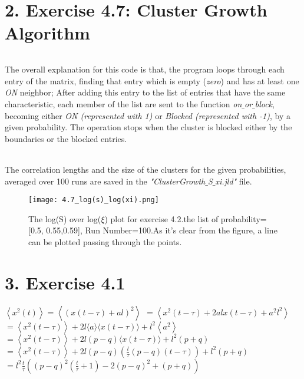 \documentclass[12pt]{article}
\begin{document}
\part*{2. Exercise 4.7: Cluster Growth Algorithm }
\paragraph*{} The overall explanation for this code is that, the program loops through each entry of the matrix, finding that entry which is empty (\textit{zero}) and has at least one \textit{ON} neighbor; After adding this entry to the list of entries that have the same characteristic, each member of the list are sent to the function \textit{on$\_$or$\_$block}, becoming either \textit{ON (represented with 1)} or \textit{Blocked (represented with -1)}, by a given probability. The operation stops when the cluster is blocked either by the boundaries or the blocked entries. 
\paragraph*{} The correlation lengths and the size of the clusters for the given probabilities, averaged over 100 runs are saved in the \textit{"ClusterGrowth$\_$S$\_$xi.jld"} file. 
\begin{figure}[H]
	\centering
	\texttt{[image: 4.7\_log(s)\_log(xi).png]}
	\label{fig:mesh2}
	\caption{The log(S) over log($\xi$) plot for exercise 4.2.the list of probability=[0.5, 0.55,0.59], Run Number=100.As it's clear from the figure, a line can be plotted passing through the points.}
\end{figure}
\part*{3. Exercise 4.1}
$\left\langle x^{2}(t)\right\rangle=\left\langle(x(t-\tau)+a l)^{2}\right\rangle$
$=\left\langle x^{2}(t-\tau)+2 a l x(t-\tau)+a^{2} l^{2}\right\rangle$\\
$=\left\langle x^{2}(t-\tau)\right\rangle+2 l\langle a\rangle\langle x(t-\tau)\rangle+l^{2}\left\langle a^{2}\right\rangle$ $=\left\langle x^{2}(t-\tau)\right\rangle+2 l(p-q)\langle x(t-\tau)\rangle+l^{2}(p+q)$\\
$=\left\langle x^{2}(t-\tau)\right\rangle+2 l(p-q)\left(\frac{l}{\tau}(p-q)(t-\tau)\right)+l^{2}(p+q)$\\
$=l^{2} \frac{t}{\tau}\left((p-q)^{2}\left(\frac{t}{\tau}+1\right)-2(p-q)^{2}+(p+q)\right)$ 
\end{document}
